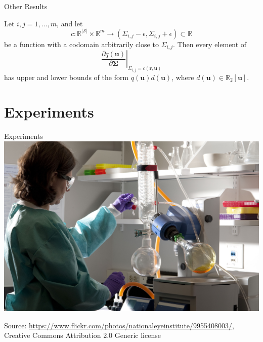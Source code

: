 \documentclass{beamer}
\begin{document}

\begin{frame}{Other Results}
  \begin{lemma}
    Let $i, j = 1, \dots, m$, and let
    \[
      c : \mathbb{R}^{|\mathcal{S}|} \times \mathbb{R}^m \to (\Sigma_{i,j} - \epsilon,
      \Sigma_{i,j} + \epsilon) \subset \mathbb{R}
    \]
    be a function with a codomain arbitrarily close to $\Sigma_{i,j}$. Then every
    element of
    \[
      \left. \frac{\partial q(\mathbf{u})}{\partial \bm\Sigma} \right|_{\Sigma_{i,j} =
        c(\mathbf{r}, \mathbf{u})}
    \]
    has upper and lower bounds of the form $q(\mathbf{u})d(\mathbf{u})$, where
    $d(\mathbf{u}) \in \mathbb{R}_2[\mathbf{u}]$.
  \end{lemma}
\end{frame}

\section{Experiments}

\begin{frame}{Experiments}
  \includegraphics[width=\textwidth]{images/experiments.jpg}
  \begin{spacing}{0.5}
    {\tiny\color{gray}Source:
      \url{https://www.flickr.com/photos/nationaleyeinstitute/9955408003/},
      Creative Commons Attribution 2.0 Generic license}
  \end{spacing}
\end{frame}
\end{document}
